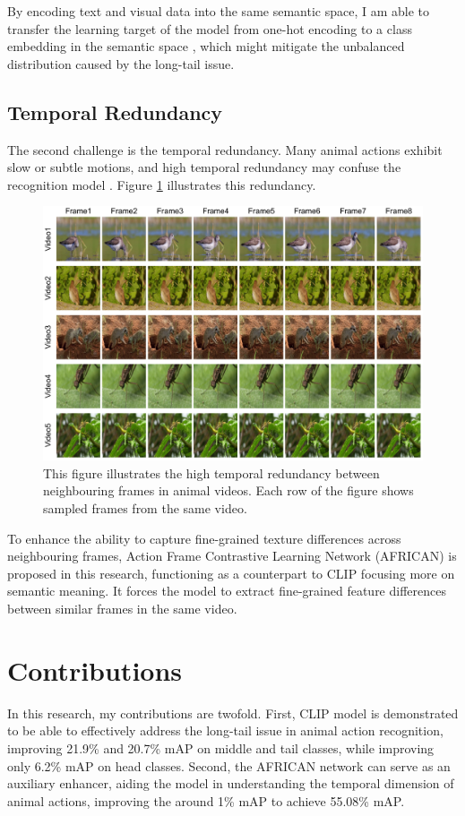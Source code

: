 By encoding text and visual data into the same semantic space, I am able to transfer the learning target of the model from one-hot encoding to a class embedding in the semantic space \parencite{ma2022x}, which might mitigate the unbalanced distribution caused by the long-tail issue. 


\subsection{Temporal Redundancy}
The second challenge is the temporal redundancy. Many animal actions exhibit slow or subtle motions, and high temporal redundancy may confuse the recognition model \parencite{YUAN2018221, li2022uniformer}. Figure \ref{fig:1_3_FrameComparison} illustrates this redundancy. 


\begin{figure}[ht]
    \centering
    \includegraphics[width=1\textwidth]{assets/charts/1_3_FrameComparison}
    \caption[Temporal Redundancy]{This figure illustrates the high temporal redundancy between neighbouring frames in animal videos. Each row of the figure shows sampled frames from the same video.}
    \label{fig:1_3_FrameComparison}
\end{figure}

To enhance the ability to capture fine-grained texture differences across neighbouring frames, Action Frame Contrastive Learning Network (AFRICAN) is proposed in this research, functioning as a counterpart to CLIP focusing more on semantic meaning. It forces the model to extract fine-grained feature differences between similar frames in the same video. 

\section{Contributions}
In this research, my contributions are twofold. First, CLIP model is demonstrated to be able to effectively address the long-tail issue in animal action recognition, improving 21.9\% and 20.7\% mAP on middle and tail classes, while improving only 6.2\% mAP on head classes. Second, the AFRICAN network can serve as an auxiliary enhancer, aiding the model in understanding the temporal dimension of animal actions, improving the around 1\% mAP to achieve 55.08\% mAP.





